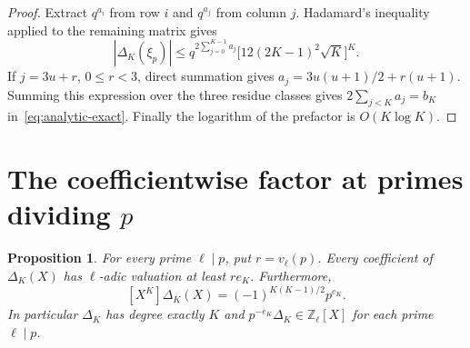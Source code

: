 \documentclass[11pt]{article}
\newtheorem{proposition}[theorem]{Proposition}
\theoremstyle{remark}
\newcommand{\Z}{\mathbb Z}
\begin{document}
\begin{proof}
Extract $q^{a_i}$ from row $i$ and $q^{a_j}$ from column $j$.
Hadamard's inequality applied to the remaining matrix gives
\[
 |\Delta_K(\xi_p)|\le
 q^{2\sum_{j=0}^{K-1}a_j}\bigl[12(2K-1)^2\sqrt K\bigr]^K.
\]
If $j=3u+r$, $0\le r<3$, direct summation gives
$a_j=3u(u+1)/2+r(u+1)$. Summing this expression over the three residue
classes gives $2\sum_{j<K}a_j=b_K$ in~\eqref{eq:analytic-exact}.
Finally the logarithm of the prefactor is $O(K\log K)$.
\end{proof}

\section{The coefficientwise factor at primes dividing $p$}

\begin{proposition}\label{prop:content}
For every prime $\ell\mid p$, put $r=v_\ell(p)$. Every coefficient of
$\Delta_K(X)$ has $\ell$-adic valuation at least $re_K$. Furthermore,
\begin{equation}\label{eq:leading}
 [X^K]\Delta_K(X)=(-1)^{K(K-1)/2}p^{e_K}.
\end{equation}
In particular $\Delta_K$ has degree exactly $K$ and
$p^{-e_K}\Delta_K\in\Z_\ell[X]$ for each prime $\ell\mid p$.
\end{proposition}
\end{document}
